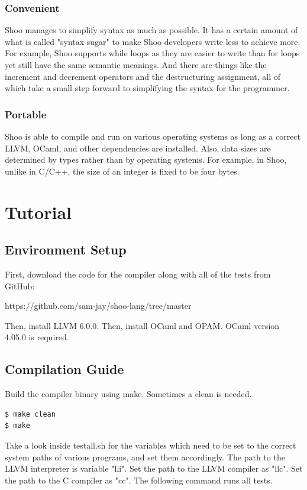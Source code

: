 \documentclass[12pt]{article}
\begin{document}
\subsubsection{Convenient}
Shoo manages to simplify syntax as much as possible. It has a certain amount of what is called "syntax sugar" to make Shoo developers write less to achieve more. For example, Shoo supports while loops as they are easier to write than for loops yet still have the same semantic meanings. And there are things like the increment and decrement operators and the destructuring assignment, all of which take a small step forward to simplifying the syntax for the programmer.

\subsubsection{Portable}
Shoo is able to compile and run on various operating systems as long as a correct LLVM, OCaml, and other dependencies are installed. Also, data sizes are determined by types rather than by operating systems. For example, in Shoo, unlike in C/C++, the size of an integer is fixed to be four bytes.

\section{Tutorial}
\subsection{Environment Setup}
First, download the code for the compiler along with all of the tests from GitHub:

https://github.com/sam-jay/shoo-lang/tree/master 

Then, install LLVM 6.0.0. Then, install OCaml and OPAM. OCaml version 4.05.0 is required. 

\subsection{Compilation Guide}
Build the compiler binary using make. Sometimes a clean is needed.

\begin{lstlisting}
$ make clean
$ make
\end{lstlisting}

Take a look inside testall.sh for the variables which need to be set to the correct system paths of various programs, and set them accordingly. The path to the LLVM interpreter is variable "lli". Set the path to the LLVM compiler as "llc". Set the path to the C compiler as "cc". The following command runs all tests.
\end{document}

